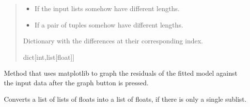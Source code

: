\documentclass[letterpaper,10pt,english]{sphinxmanual}
\begin{document}
\begin{fulllineitems}
\begin{fulllineitems}
\begin{quote}
\begin{description}
\begin{itemize}
\end{itemize}

\begin{itemize}
\item {} 
\sphinxAtStartPar
{} \textendash{} If the input lists somehow have different lengths.

\item {} 
\sphinxAtStartPar
{} \textendash{} If a pair of tuples somehow have different lengths.

\end{itemize}

\sphinxAtStartPar
Dictionary with the differences at their corresponding index.

\sphinxAtStartPar
dict{[}int,list{[}float{]}{]}

\end{description}\end{quote}

\end{fulllineitems}


\begin{fulllineitems}
\label{\detokenize{CTkResultInterface:src.CTkResultInterface.ResultInterface.graph_residuals}}
\pysigstartsignatures
{}
\pysigstopsignatures
\sphinxAtStartPar
Method that uses matplotlib to graph the residuals of the fitted model against
the input data after the graph button is pressed.

\end{fulllineitems}


\begin{fulllineitems}
\label{\detokenize{CTkResultInterface:src.CTkResultInterface.ResultInterface.process_lists}}
\pysigstartsignatures
{}
\pysigstopsignatures
\sphinxAtStartPar
Converts a list of lists of floats into a list of floats,
if there is only a single sub\sphinxhyphen{}list.


\end{fulllineitems}
\end{fulllineitems}
\end{document}
